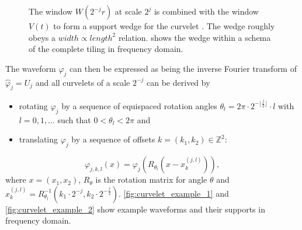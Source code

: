 \begin{figure}[h]
    \centering
    \quad
    \quad
    \quad
    \caption[Curvelet frequency windows]{
        The window $W(2^{-j}r)$ at scale $2^j$
         is combined with the
        window $V(t)$  to form a
        support wedge for the curvelet
        . The wedge roughly
        obeys a $width \propto length^2$ relation.
         shows the wedge within a
        schema of the complete tiling in frequency domain.
    }
    \label{fig:curvelet_frequency_windows}
\end{figure}

The waveform $\varphi_j$ can then be expressed as being the inverse Fourier
transform of $\hat{\varphi}_j = U_j$ and all curvelets of a scale $2^{-j}$ can
be derived by
\begin{itemize}
    \item rotating $\varphi_j$ by a sequence of equispaced rotation angles
        $\theta_l = 2 \pi \cdot 2^{-\lfloor\frac{j}{2}\rfloor} \cdot l$ with $l
        = 0,1,\dots$ such that $0 < \theta_l < 2 \pi$ and
    \item translating $\varphi_j$ by a sequence of offsets $k = (k_1, k_2) \in \mathbb{Z}^2$:
\end{itemize}
\begin{equation} \label{eq:continuous_curvelet}
    \varphi_{j,k,l}(x) = \varphi_j(R_{\theta_l}(x - x_k^{(j,l)})),
\end{equation}
where $x = (x_1, x_2)$, $R_{\theta}$ is the rotation matrix for angle $\theta$
and $x_k^{(j,l)} = R_{\theta_l}^{-1}(k_1 \cdot 2^{-j}, k_2 \cdot
2^{-\frac{j}{2}})$. \autoref{fig:curvelet_example_1} and
\autoref{fig:curvelet_example_2} show example waveforms and their supports in
frequency domain.

